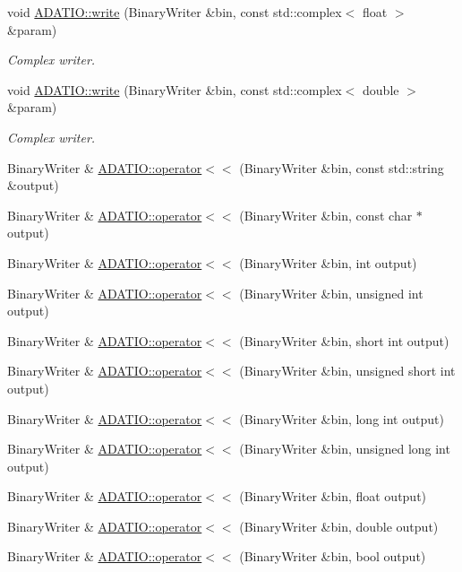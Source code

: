\begin{DoxyCompactItemize}
\item 
void \mbox{\hyperlink{namespaceADATIO_a653bde19d92b24f8269adfa361bdabda}{A\+D\+A\+T\+I\+O\+::write}} (Binary\+Writer \&bin, const std\+::complex$<$ float $>$ \&param)
\begin{DoxyCompactList}\small\item\em Complex writer. \end{DoxyCompactList}\item 
void \mbox{\hyperlink{namespaceADATIO_a4d080cdbb3d8b34b2e8cf03001f8b7f0}{A\+D\+A\+T\+I\+O\+::write}} (Binary\+Writer \&bin, const std\+::complex$<$ double $>$ \&param)
\begin{DoxyCompactList}\small\item\em Complex writer. \end{DoxyCompactList}\item 
Binary\+Writer \& \mbox{\hyperlink{namespaceADATIO_a10c403177088d104f13bd52cefae2a84}{A\+D\+A\+T\+I\+O\+::operator$<$$<$}} (Binary\+Writer \&bin, const std\+::string \&output)
\item 
Binary\+Writer \& \mbox{\hyperlink{namespaceADATIO_aa30c54a0a5271fc122506186fdf276c0}{A\+D\+A\+T\+I\+O\+::operator$<$$<$}} (Binary\+Writer \&bin, const char $\ast$output)
\item 
Binary\+Writer \& \mbox{\hyperlink{namespaceADATIO_a07c89597706480c0ec7b346192b1f121}{A\+D\+A\+T\+I\+O\+::operator$<$$<$}} (Binary\+Writer \&bin, int output)
\item 
Binary\+Writer \& \mbox{\hyperlink{namespaceADATIO_a9b4a06d24af68d2a6c22f575e0a0584a}{A\+D\+A\+T\+I\+O\+::operator$<$$<$}} (Binary\+Writer \&bin, unsigned int output)
\item 
Binary\+Writer \& \mbox{\hyperlink{namespaceADATIO_acfdbfb8beb266b5c5f28a065b0a2e4b5}{A\+D\+A\+T\+I\+O\+::operator$<$$<$}} (Binary\+Writer \&bin, short int output)
\item 
Binary\+Writer \& \mbox{\hyperlink{namespaceADATIO_aff2f4933a66b5468387c2361b16922ce}{A\+D\+A\+T\+I\+O\+::operator$<$$<$}} (Binary\+Writer \&bin, unsigned short int output)
\item 
Binary\+Writer \& \mbox{\hyperlink{namespaceADATIO_a02e2a976b2de62419c11d0a1a112c31e}{A\+D\+A\+T\+I\+O\+::operator$<$$<$}} (Binary\+Writer \&bin, long int output)
\item 
Binary\+Writer \& \mbox{\hyperlink{namespaceADATIO_a669b878c72c25b392c3068a6286e721e}{A\+D\+A\+T\+I\+O\+::operator$<$$<$}} (Binary\+Writer \&bin, unsigned long int output)
\item 
Binary\+Writer \& \mbox{\hyperlink{namespaceADATIO_a9a1401ffe0590b7a54c2690d79073c22}{A\+D\+A\+T\+I\+O\+::operator$<$$<$}} (Binary\+Writer \&bin, float output)
\item 
Binary\+Writer \& \mbox{\hyperlink{namespaceADATIO_a48a968b3177d5e46941cf9a358881c23}{A\+D\+A\+T\+I\+O\+::operator$<$$<$}} (Binary\+Writer \&bin, double output)
\item 
Binary\+Writer \& \mbox{\hyperlink{namespaceADATIO_a3cf019d891bf2265bd3c530f1bdd46a0}{A\+D\+A\+T\+I\+O\+::operator$<$$<$}} (Binary\+Writer \&bin, bool output)
\end{DoxyCompactItemize}
